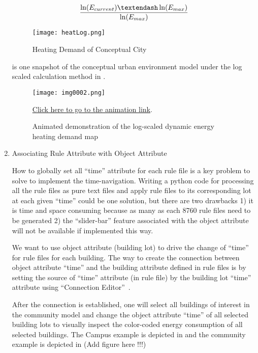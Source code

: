 \begin{enumerate}[1)]
  \begin{equation}\label{eq:log} 
    {\ln(E_{current}) – \ln(E_{max}) \over \ln(E_{max})}
  \end{equation}

  \begin{figure}[h!]
    \centering
    \texttt{[image: heatLog.png]}
    \caption[Heating Demand of Conceptual City]{Heating Demand of
      Conceptual City}
    \label{fig:heatLog}
  \end{figure}

   is one snapshot of the conceptual urban
  environment model under the log scaled calculation method in
  .
  \begin{figure}[h!]
    \centering
    \texttt{[image: img0002.png]}
    \caption[Animation Demo of the Color Calculation]{Animated
      demonstration of the log-scaled dynamic energy heating demand
      map}
    \label{fig:img0002}
    \href{http://www.armechxyj.com/energy-mapping.html/#colorAnime}{Click
      here to go to the animation link}.
  \end{figure}

\item{Associating Rule Attribute with Object Attribute} 

  How to globally set all ``time'' attribute for each rule file is a
  key problem to solve to implement the time-navigation. Writing a
  python code for processing all the rule files as pure text files and
  apply rule files to its corresponding lot at each given ``time''
  could be one solution, but there are two drawbacks 1) it is time and
  space consuming because as many as each 8760 rule files need to be
  generated 2) the ``slider-bar'' feature associated with the object
  attribute will not be available if implemented this way.

  We want to use object attribute (building lot) to drive the change
  of ``time'' for rule files for each building. The way to create the
  connection between object attribute ``time'' and the building
  attribute defined in rule files is by setting the source of ``time''
  attribute (in rule file) by the building lot ``time'' attribute
  using ``Connection Editor''~\cite{cityEngineAttConect2015}.

  After the connection is established, one will select all buildings
  of interest in the community model and change the object attribute
  ``time'' of all selected building lots to visually inspect the
  color-coded energy consumption of all selected buildings. The Campus
  example is depicted in  and the community
  example is depicted in (Add figure here !!!)


\end{enumerate}
